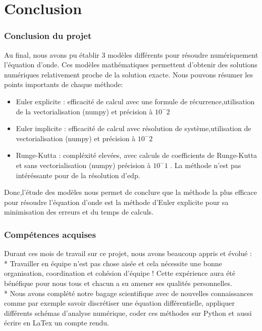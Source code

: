 \part{Conclusion}

\section{Conclusion du projet}
Au final, nous avons pu établir 3 modèles différents pour résoudre numériquement l'équation d'onde. Ces modèles mathématiques permettent d'obtenir des solutions numériques relativement proche de la solution exacte.
Nous pouvons résumer les points importants de chaque méthode:
\begin{itemize}
    \item Euler explicite : efficacité de calcul avec une formule de récurrence,utilisation de la vectorialisation (numpy) et précision à $10^-2$
    \item Euler implicite : efficacité de calcul avec résolution de système,utilisation de vectorialisation (numpy) et précision à $10^-2$
    \item Runge-Kutta : compléxité elevées, avec calculs de coefficients de Runge-Kutta et sans vectorialisation (numpy) précision à $10^-1$ . La méthode n'est pas intéréssante pour de la résolution d'edp.
\end{itemize}
Donc,l'étude des modèles nous permet de conclure que la méthode la plus efficace pour résoudre l'équation d'onde est la méthode d'Euler explicite pour sa minimisation des erreurs et du temps de calculs.
\section{Compétences acquises}

Durant ces mois de travail sur ce projet, nous avons beaucoup appris et évolué :\\ 

* Travailler en équipe n'est pas chose aisée et cela nécessite une bonne organisation, coordination et cohésion d'équipe ! Cette expérience aura été bénéfique pour nous tous et chacun a su amener ses qualités personnelles.\\

* Nous avons complété notre bagage scientifique avec de nouvelles connaissances comme par exemple savoir discrétiser une équation différentielle, appliquer différents schémas d'analyse numérique, coder ces méthodes sur Python et aussi écrire en LaTex un compte rendu.